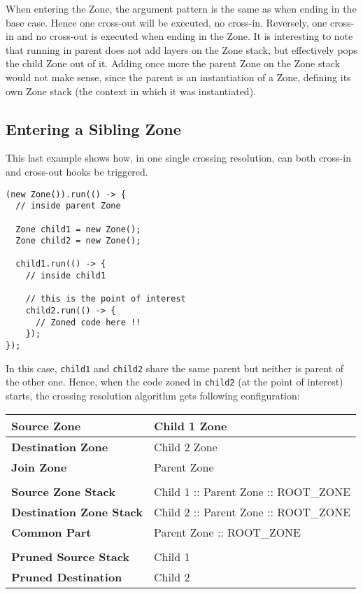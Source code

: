 When entering the Zone, the argument pattern is the same as when ending in the base case. Hence one cross-out will be executed, no cross-in. Reversely, one cross-in and no cross-out is executed when ending in the Zone.
It is interesting to note that running in parent does not add layers on the Zone stack, but effectively pops the child Zone out of it. Adding once more the parent Zone on the Zone stack would not make sense, since the parent is an instantiation of a Zone, defining its own Zone stack (the context in which it was instantiated).


\subsection*{Entering a Sibling Zone}

This last example shows how, in one single crossing resolution, can both cross-in and cross-out hooks be triggered.

\begin{lstlisting}
(new Zone()).run(() -> {
  // inside parent Zone

  Zone child1 = new Zone();
  Zone child2 = new Zone();

  child1.run(() -> {
    // inside child1
    
    // this is the point of interest
    child2.run(() -> {
      // Zoned code here !!
    });
});
\end{lstlisting}

In this case, \lstinline{child1} and \lstinline{child2} share the same parent but neither is parent of the other one. Hence, when the code zoned in \lstinline{child2} (at the point of interest) starts, the crossing resolution algorithm gets following configuration:

\begin{tabular}{| l | l |}
\hline
\textbf{Source Zone} & Child 1 Zone
\\ \hline
\textbf{Destination Zone} & Child 2 Zone
\\ \hline
\textbf{Join Zone} & Parent Zone
\\ \hline
\multicolumn{2}{l}{}
\\ \hline
\textbf{Source Zone Stack} & Child 1 :: Parent Zone :: ROOT\_ZONE
\\ \hline
\textbf{Destination Zone Stack} & Child 2 :: Parent Zone :: ROOT\_ZONE
\\ \hline
\textbf{Common Part} & Parent Zone :: ROOT\_ZONE
\\ \hline
\multicolumn{2}{l}{}
\\ \hline
\textbf{Pruned Source Stack} & Child 1
\\ \hline
\textbf{Pruned Destination} & Child 2
\\ \hline
\end{tabular}

